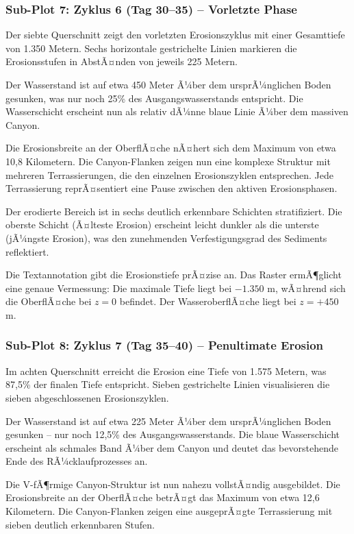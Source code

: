 \subsubsection*{Sub-Plot 7: Zyklus 6 (Tag 30--35) -- Vorletzte Phase}

Der siebte Querschnitt zeigt den vorletzten Erosionszyklus mit einer Gesamttiefe von 1.350 Metern. Sechs horizontale gestrichelte Linien markieren die Erosionsstufen in AbstÃ¤nden von jeweils 225 Metern.

Der Wasserstand ist auf etwa 450 Meter Ã¼ber dem ursprÃ¼nglichen Boden gesunken, was nur noch 25\% des Ausgangswasserstands entspricht. Die Wasserschicht erscheint nun als relativ dÃ¼nne blaue Linie Ã¼ber dem massiven Canyon.

Die Erosionsbreite an der OberflÃ¤che nÃ¤hert sich dem Maximum von etwa 10,8 Kilometern. Die Canyon-Flanken zeigen nun eine komplexe Struktur mit mehreren Terrassierungen, die den einzelnen Erosionszyklen entsprechen. Jede Terrassierung reprÃ¤sentiert eine Pause zwischen den aktiven Erosionsphasen.

Der erodierte Bereich ist in sechs deutlich erkennbare Schichten stratifiziert. Die oberste Schicht (Ã¤lteste Erosion) erscheint leicht dunkler als die unterste (jÃ¼ngste Erosion), was den zunehmenden Verfestigungsgrad des Sediments reflektiert.

Die Textannotation gibt die Erosionstiefe prÃ¤zise an. Das Raster ermÃ¶glicht eine genaue Vermessung: Die maximale Tiefe liegt bei $-1.350$ m, wÃ¤hrend sich die OberflÃ¤che bei $z = 0$ befindet. Der WasseroberflÃ¤che liegt bei $z = +450$ m.

\subsubsection*{Sub-Plot 8: Zyklus 7 (Tag 35--40) -- Penultimate Erosion}

Im achten Querschnitt erreicht die Erosion eine Tiefe von 1.575 Metern, was 87,5\% der finalen Tiefe entspricht. Sieben gestrichelte Linien visualisieren die sieben abgeschlossenen Erosionszyklen.

Der Wasserstand ist auf etwa 225 Meter Ã¼ber dem ursprÃ¼nglichen Boden gesunken -- nur noch 12,5\% des Ausgangswasserstands. Die blaue Wasserschicht erscheint als schmales Band Ã¼ber dem Canyon und deutet das bevorstehende Ende des RÃ¼cklaufprozesses an.

Die V-fÃ¶rmige Canyon-Struktur ist nun nahezu vollstÃ¤ndig ausgebildet. Die Erosionsbreite an der OberflÃ¤che betrÃ¤gt das Maximum von etwa 12,6 Kilometern. Die Canyon-Flanken zeigen eine ausgeprÃ¤gte Terrassierung mit sieben deutlich erkennbaren Stufen.


